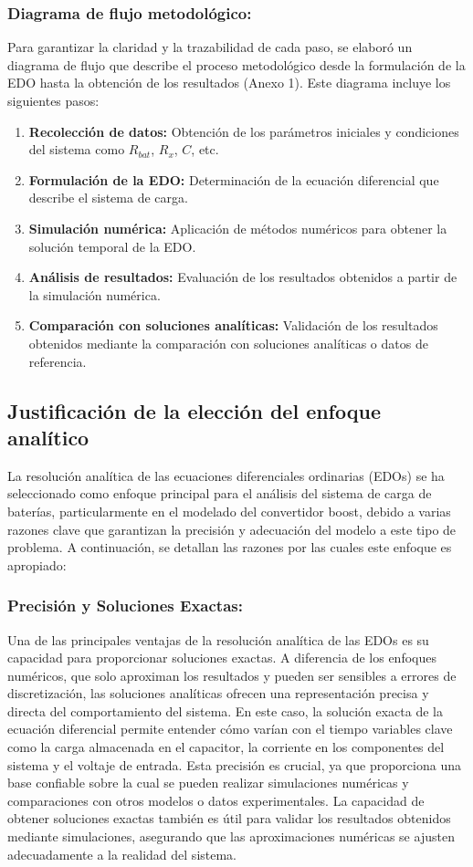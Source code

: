 \subsubsection*{Diagrama de flujo metodológico:}
Para garantizar la claridad y la trazabilidad de cada paso, se elaboró un diagrama de flujo que
describe el proceso metodológico desde la formulación de la EDO hasta la obtención de los
resultados (Anexo 1). Este diagrama incluye los siguientes pasos:
\begin{enumerate}
	\item \textbf{Recolección de datos:} Obtención de los parámetros iniciales y condiciones del sistema como \(R_{bat}\), \(R_x\), \(C\), etc.
	\item \textbf{Formulación de la EDO:} Determinación de la ecuación diferencial que describe el sistema de carga.
	\item \textbf{Simulación numérica:} Aplicación de métodos numéricos para obtener la solución temporal de la EDO.
	\item \textbf{Análisis de resultados:} Evaluación de los resultados obtenidos a partir de la simulación numérica.
	\item \textbf{Comparación con soluciones analíticas:} Validación de los resultados obtenidos mediante la comparación con soluciones analíticas o datos de referencia.
\end{enumerate}

\subsection{Justificación de la elección del enfoque analítico}
La resolución analítica de las ecuaciones diferenciales ordinarias (EDOs) se ha seleccionado como
enfoque principal para el análisis del sistema de carga de baterías, particularmente en el modelado del
convertidor boost, debido a varias razones clave que garantizan la precisión y adecuación del modelo
a este tipo de problema. A continuación, se detallan las razones por las cuales este enfoque es
apropiado:

\subsubsection*{Precisión y Soluciones Exactas:}
Una de las principales ventajas de la resolución analítica de las EDOs es su capacidad para
proporcionar soluciones exactas. A diferencia de los enfoques numéricos, que solo aproximan
los resultados y pueden ser sensibles a errores de discretización, las soluciones analíticas
ofrecen una representación precisa y directa del comportamiento del sistema. En este caso, la
solución exacta de la ecuación diferencial permite entender cómo varían con el tiempo
variables clave como la carga almacenada en el capacitor, la corriente en los componentes del
sistema y el voltaje de entrada. Esta precisión es crucial, ya que proporciona una base
confiable sobre la cual se pueden realizar simulaciones numéricas y comparaciones con otros
modelos o datos experimentales. La capacidad de obtener soluciones exactas también es útil
para validar los resultados obtenidos mediante simulaciones, asegurando que las
aproximaciones numéricas se ajusten adecuadamente a la realidad del sistema.


